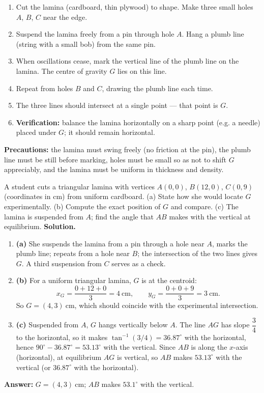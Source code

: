 \documentclass[11pt]{article}
\newcommand{\cle}[1]{{\popxbold\color{popdark}#1}}
\begin{document}
\begin{experience}
\begin{enumerate}
\item Cut the lamina (cardboard, thin plywood) to shape. Make three small holes $A$, $B$, $C$ near the edge.
\item Suspend the lamina freely from a pin through hole $A$. Hang a \cle{plumb line} (string with a small bob) from the same pin.
\item When oscillations cease, mark the vertical line of the plumb line on the lamina. The centre of gravity $G$ lies on this line.
\item Repeat from holes $B$ and $C$, drawing the plumb line each time.
\item The three lines should intersect at a single point — that point is $G$.
\item \textbf{Verification:} balance the lamina horizontally on a sharp point (e.g. a needle) placed under $G$; it should remain horizontal.
\end{enumerate}
\textbf{Precautions:} the lamina must swing freely (no friction at the pin), the plumb line must be still before marking, holes must be small so as not to shift $G$ appreciably, and the lamina must be uniform in thickness and density.
\end{experience}

\begin{exoresolu}
A student cuts a triangular lamina with vertices $A(0,0)$, $B(12,0)$, $C(0,9)$ (coordinates in cm) from uniform cardboard. (a) State how she would locate $G$ experimentally. (b) Compute the exact position of $G$ and compare. (c) The lamina is suspended from $A$; find the angle that $AB$ makes with the vertical at equilibrium.
\tcblower
\textbf{Solution.}
\begin{enumerate}
\item \textbf{(a)} She suspends the lamina from a pin through a hole near $A$, marks the plumb line; repeats from a hole near $B$; the intersection of the two lines gives $G$. A third suspension from $C$ serves as a check.
\item \textbf{(b)} For a uniform triangular lamina, $G$ is at the centroid:
\[ x_G=\frac{0+12+0}{3}=4\ \mathrm{cm},\qquad y_G=\frac{0+0+9}{3}=3\ \mathrm{cm}. \]
So $G=(4,3)\ \mathrm{cm}$, which should coincide with the experimental intersection.
\item \textbf{(c)} Suspended from $A$, $G$ hangs vertically below $A$. The line $AG$ has slope $\dfrac{3}{4}$ to the horizontal, so it makes $\tan^{-1}(3/4)=36.87^{\circ}$ with the horizontal, hence $90^{\circ}-36.87^{\circ}=53.13^{\circ}$ with the vertical. Since $AB$ is along the $x$-axis (horizontal), at equilibrium $AG$ is vertical, so $AB$ makes $53.13^{\circ}$ with the vertical (or $36.87^{\circ}$ with the horizontal).
\end{enumerate}
\textbf{Answer:} $G=(4,3)\ \mathrm{cm}$; $AB$ makes $53.1^{\circ}$ with the vertical.
\end{exoresolu}
\end{document}
